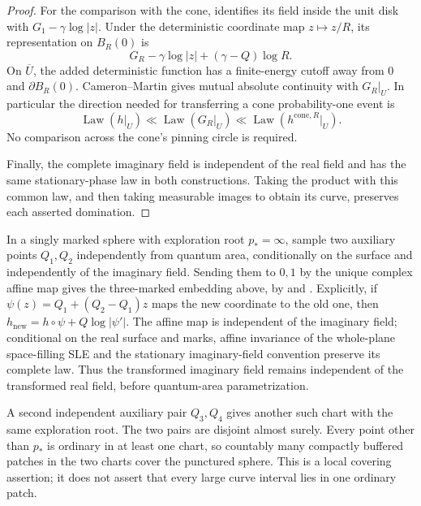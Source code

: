 \begin{proof}
For the comparison with the cone, \cite[Definition~4.10 and the
following discussion]{DMS} identifies its field inside the unit disk
with \(G_1-\gamma\log|z|\). Under the deterministic coordinate map
\(z\mapsto z/R\), its representation on \(B_R(0)\) is
\[
 G_R-\gamma\log|z|+(\gamma-Q)\log R.
\]
On \(\overline U\), the added deterministic function has a
finite-energy cutoff away from \(0\) and \(\partial B_R(0)\).
Cameron--Martin gives mutual absolute continuity with \(G_R|_U\).
In particular the direction needed for transferring a cone
probability-one event is
\[
 \operatorname{Law}(h|_U)
 \ll \operatorname{Law}(G_R|_U)
 \ll \operatorname{Law}(h^{\mathrm{cone},R}|_U).
\]
No comparison across the cone's pinning circle is required.

Finally, the complete imaginary field is independent of the real
field and has the same stationary-phase law in both constructions.
Taking the product with this common law, and then taking measurable
images to obtain its curve, preserves each asserted domination.
\end{proof}

\begin{remark}\label{bg:sphere-affine-marks}
In a singly marked sphere with exploration root \(p_*=\infty\),
sample two auxiliary points \(Q_1,Q_2\) independently from quantum
area, conditionally on the surface and independently of the imaginary
field. Sending them to \(0,1\) by the unique complex affine map gives
the three-marked embedding above, by
\cite[Lemma~2.3]{BorgaGwynneSunPermutons} and
\cite[Proposition~A.13]{DMS}. Explicitly, if
\(\psi(z)=Q_1+(Q_2-Q_1)z\) maps the new coordinate to the old one,
then \(h_{\mathrm{new}}=h\circ\psi+Q\log|\psi'|\).
The affine map is independent of the imaginary field; conditional on
the real surface and marks, affine invariance of the whole-plane
space-filling SLE and the stationary imaginary-field convention
preserve its complete law. Thus the transformed imaginary field
remains independent of the transformed real field, before quantum-area
parametrization.

A second independent auxiliary pair \(Q_3,Q_4\) gives another such
chart with the same exploration root. The two pairs are disjoint
almost surely. Every point other than \(p_*\) is ordinary in at least
one chart, so countably many compactly buffered patches in the two
charts cover the punctured sphere. This is a local covering assertion;
it does not assert that every large curve interval lies in one
ordinary patch.
\end{remark}

